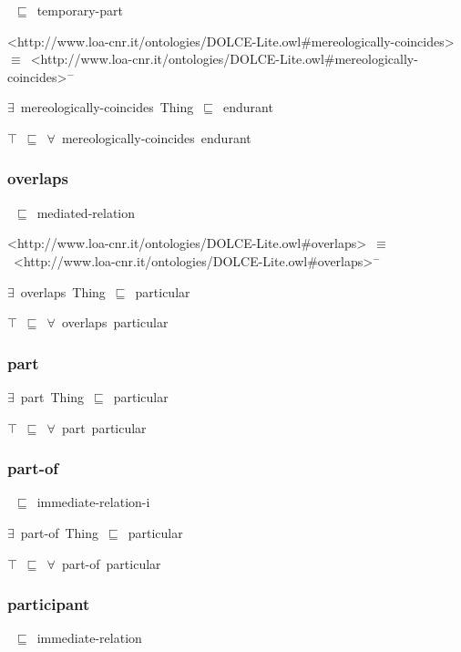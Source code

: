 \documentclass{article}
\begin{document}
~\ensuremath{\sqsubseteq}~temporary-part

<http://www.loa-cnr.it/ontologies/DOLCE-Lite.owl#mereologically-coincides>~\ensuremath{\equiv}~<http://www.loa-cnr.it/ontologies/DOLCE-Lite.owl#mereologically-coincides>\ensuremath{^-}

\ensuremath{\exists}~mereologically-coincides~Thing~\ensuremath{\sqsubseteq}~endurant

\ensuremath{\top}~\ensuremath{\sqsubseteq}~\ensuremath{\forall}~mereologically-coincides~endurant

\subsubsection*{overlaps}

~\ensuremath{\sqsubseteq}~mediated-relation

<http://www.loa-cnr.it/ontologies/DOLCE-Lite.owl#overlaps>~\ensuremath{\equiv}~<http://www.loa-cnr.it/ontologies/DOLCE-Lite.owl#overlaps>\ensuremath{^-}

\ensuremath{\exists}~overlaps~Thing~\ensuremath{\sqsubseteq}~particular

\ensuremath{\top}~\ensuremath{\sqsubseteq}~\ensuremath{\forall}~overlaps~particular

\subsubsection*{part}

\ensuremath{\exists}~part~Thing~\ensuremath{\sqsubseteq}~particular

\ensuremath{\top}~\ensuremath{\sqsubseteq}~\ensuremath{\forall}~part~particular

\subsubsection*{part-of}

~\ensuremath{\sqsubseteq}~immediate-relation-i

\ensuremath{\exists}~part-of~Thing~\ensuremath{\sqsubseteq}~particular

\ensuremath{\top}~\ensuremath{\sqsubseteq}~\ensuremath{\forall}~part-of~particular

\subsubsection*{participant}

~\ensuremath{\sqsubseteq}~immediate-relation
\end{document}
